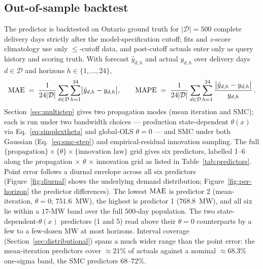\subsection{Out-of-sample backtest}
\label{sec:backtest}

The predictor is backtested on Ontario ground truth for
\(|\mathcal{D}| = 500\) complete delivery days strictly after the
model-specification cutoff; fits and \(z\)-score climatology use only
\(\le\)-cutoff data, and post-cutoff actuals enter only as query
history and scoring truth. With forecast \(\hat{y}_{d,h}\) and actual
\(y_{d,h}\) over delivery days \(d \in \mathcal{D}\) and horizons
\(h \in \{1, \ldots, 24\}\),
\begin{equation}
\label{eq:mae-mape}
\mathrm{MAE} \;=\; \frac{1}{24|\mathcal{D}|}
\sum_{d \in \mathcal{D}} \sum_{h=1}^{24}
\bigl| \hat{y}_{d,h} - y_{d,h} \bigr|,
\qquad
\mathrm{MAPE} \;=\; \frac{1}{24|\mathcal{D}|}
\sum_{d \in \mathcal{D}} \sum_{h=1}^{24}
\frac{\bigl| \hat{y}_{d,h} - y_{d,h} \bigr|}{y_{d,h}} \,.
\end{equation}
Section~\ref{sec:multistep} gives two propagation modes (mean
iteration and SMC); each is run under two bandwidth choices ---
production state-dependent \(\theta(x)\) via Eq.~\ref{eq:simplextheta}
and global-OLS \(\theta = 0\) --- and SMC under both Gaussian
(Eq.~\ref{eq:smc-step}) and empirical-residual innovation sampling.
The full \(\{\text{propagation}\} \times \{\theta\} \times
\{\text{innovation law}\}\) grid gives six predictors,
labelled 1--6 along the propagation \(\times\)
\(\theta\) \(\times\) innovation grid as listed in
Table~\ref{tab:predictors}. Point error follows a diurnal envelope
across all six predictors (Figure~\ref{fig:diurnal} shows the
underlying demand distribution; Figure~\ref{fig:per-horizon} the
predictor differences). The lowest \(\mathrm{MAE}\) is predictor 2
(mean-iteration, \(\theta = 0\); \(751.6\)~MW), the highest is
predictor 1 (\(768.8\)~MW), and all six lie within a \(17\)-MW band
over the full \(500\)-day population. The two
state-dependent-\(\theta(x)\) predictors (1 and 5) read above their
\(\theta = 0\) counterparts by a few to a few-dozen MW at most
horizons. Interval coverage (Section~\ref{sec:distributional})
spans a much wider range than the point error: the mean-iteration
predictors cover \(\approx 21\%\) of actuals against a nominal
\(\approx 68.3\%\) one-sigma band, the SMC predictors
\(68\)--\(72\%\).


